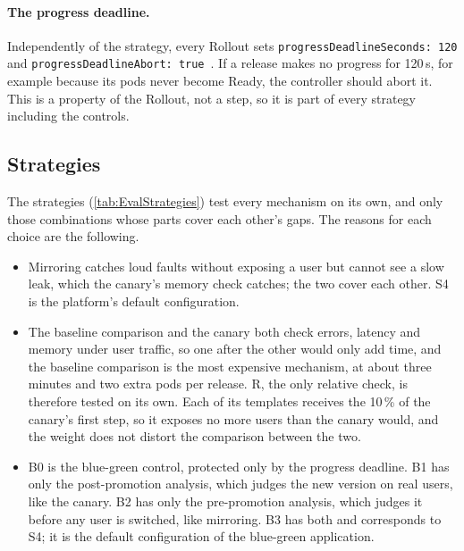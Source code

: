 \paragraph{The progress deadline.} Independently of the strategy, every Rollout sets \texttt{progressDeadlineSeconds: 120} and \texttt{progressDeadlineAbort: true}~\cite{ArgoRolloutsSpec}. If a release makes no progress for 120\,s, for example because its pods never become Ready, the controller should abort it. This is a property of the Rollout, not a step, so it is part of every strategy including the controls.

\subsection{Strategies}
\label{sec:EvalStrategies}
The strategies (\autoref{tab:EvalStrategies}) test every mechanism on its own, and only those combinations whose parts cover each other's gaps. The reasons for each choice are the following.
\begin{itemize}
	\item Mirroring catches loud faults without exposing a user but cannot see a slow leak, which the canary's memory check catches; the two cover each other. S4 is the platform's default configuration.
	\item The baseline comparison and the canary both check errors, latency and memory under user traffic, so one after the other would only add time, and the baseline comparison is the most expensive mechanism, at about three minutes and two extra pods per release. R, the only relative check, is therefore tested on its own. Each of its templates receives the 10\,\% of the canary's first step, so it exposes no more users than the canary would, and the weight does not distort the comparison between the two.
	\item B0 is the blue-green control, protected only by the progress deadline. B1 has only the post-promotion analysis, which judges the new version on real users, like the canary. B2 has only the pre-promotion analysis, which judges it before any user is switched, like mirroring. B3 has both and corresponds to S4; it is the default configuration of the blue-green application.
\end{itemize}

